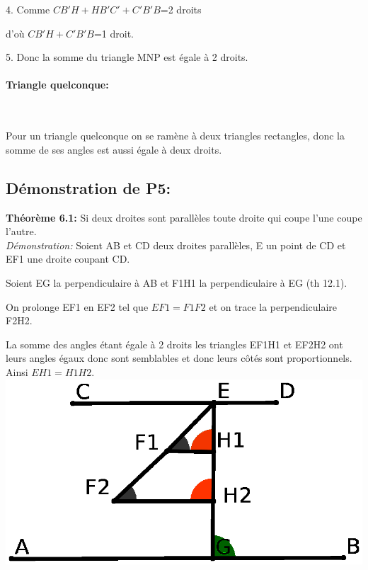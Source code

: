 \documentclass[a4paper, 12pt, twoside]{book}
\begin{document}
 
  
  4. Comme $CB'H+HB'C'+C'B'B$=2 droits\
  
  d'où $CB'H+C'B'B$=1 droit. 
  
  5. Donc la somme du triangle MNP est égale à 2 droits.
  
 \paragraph{Triangle quelconque:}\
 
   Pour un triangle quelconque on se ramène à deux triangles rectangles, donc la somme de ses angles est aussi égale à deux droits.\
   
  \newpage  \subsection{Démonstration de P5:}
    
    \textbf{Théorème 6.1:} Si deux droites sont parallèles toute droite qui coupe l'une coupe l'autre.\\

    
      
  
 \textit{Démonstration:} Soient AB et CD deux droites parallèles, E un point de CD et EF1 une droite coupant CD.\
 
 Soient EG la perpendiculaire à AB et F1H1 la perpendiculaire à EG (th 12.1).\
 
 On prolonge EF1 en EF2 tel que $EF1=F1F2$ et on trace la perpendiculaire F2H2. \
 
 La somme des angles étant égale à 2 droits les triangles EF1H1 et EF2H2 ont leurs angles égaux donc sont semblables et donc leurs côtés sont proportionnels. Ainsi $EH1=H1H2$.\\

 
 
 \includegraphics[scale=0.6]{figures/WALLIS5.eps} \\
 
\end{document}
